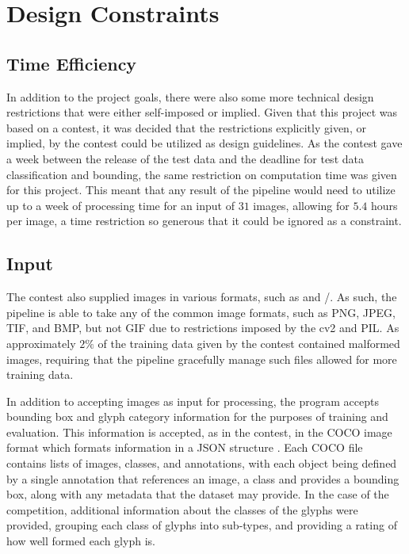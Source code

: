 \section{Design Constraints}

\subsection{Time Efficiency}

In addition to the project goals, there were also some more technical design restrictions that were either self-imposed or implied. Given that this project was based on a contest, it was decided that the restrictions explicitly given, or implied, by the contest could be utilized as design guidelines. As the contest gave a week between the release of the test data and the deadline for test data classification and bounding, the same restriction on computation time was given for this project. This meant that any result of the pipeline would need to utilize up to a week of processing time for an input of $31$ images, allowing for $5.4$ hours per image, a time restriction so generous that it could be ignored as a constraint.

\subsection{Input}

The contest also supplied images in various formats, such as  and /. As such, the pipeline is able to take any of the common image formats, such as PNG, JPEG, TIF, and BMP, but not GIF due to restrictions imposed by the cv2 and PIL. As approximately $2\%$ of the training data given by the contest contained malformed images, requiring that the pipeline gracefully manage such files allowed for more training data.

In addition to accepting images as input for processing, the program accepts bounding box and glyph category information for the purposes of training and evaluation. This information is accepted, as in the contest, in the COCO image format which formats information in a JSON structure . Each COCO file contains lists of images, classes, and annotations, with each object being defined by a single annotation that references an image, a class and provides a bounding box, along with any metadata that the dataset may provide. In the case of the competition, additional information about the classes of the glyphs were provided, grouping each class of glyphs into sub-types, and providing a rating of how well formed each glyph is.

